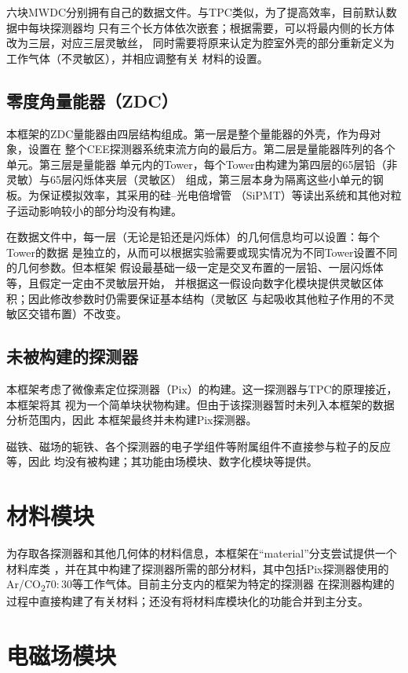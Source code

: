 \documentclass[bachelor,openany,oneside,color]{buaathesis}
\begin{document}
六块MWDC分别拥有自己的数据文件。与TPC类似，为了提高效率，目前默认数据中每块探测器均
只有三个长方体依次嵌套；根据需要，可以将最内侧的长方体改为三层，对应三层灵敏丝，
同时需要将原来认定为腔室外壳的部分重新定义为工作气体（不灵敏区），并相应调整有关
材料的设置。

\subsection{零度角量能器（ZDC）}

本框架的ZDC量能器由四层结构组成。第一层是整个量能器的外壳，作为母对象，设置在
整个CEE探测器系统束流方向的最后方。第二层是量能器阵列的各个单元。第三层是量能器
单元内的Tower，每个Tower由构建为第四层的65层铅（非灵敏）与65层闪烁体夹层（灵敏区）
组成，第三层本身为隔离这些小单元的钢板。为保证模拟效率，其采用的硅--光电倍增管
（SiPMT）等读出系统和其他对粒子运动影响较小的部分均没有构建。

在数据文件中，每一层（无论是铅还是闪烁体）的几何信息均可以设置：每个Tower的数据
是独立的，从而可以根据实验需要或现实情况为不同Tower设置不同的几何参数。但本框架
假设最基础一级一定是交叉布置的一层铅、一层闪烁体等，且假定一定由不灵敏层开始，
并根据这一假设向数字化模块提供灵敏区体积；因此修改参数时仍需要保证基本结构（灵敏区
与起吸收其他粒子作用的不灵敏区交错布置）不改变。

\subsection{未被构建的探测器}

本框架考虑了微像素定位探测器（Pix）的构建。这一探测器与TPC的原理接近，本框架将其
视为一个简单块状物构建。但由于该探测器暂时未列入本框架的数据分析范围内，因此
本框架最终并未构建Pix探测器。

磁铁、磁场的轭铁、各个探测器的电子学组件等附属组件不直接参与粒子的反应等，因此
均没有被构建；其功能由场模块、数字化模块等提供。

\section{材料模块}

为存取各探测器和其他几何体的材料信息，本框架在“material”分支尝试提供一个材料库类
，并在其中构建了探测器所需的部分材料，其中包括Pix探测器使用的
Ar/CO\textsubscript{2}$70:30$等工作气体。目前主分支内的框架为特定的探测器
在探测器构建的过程中直接构建了有关材料；还没有将材料库模块化的功能合并到主分支。

\section{电磁场模块}
\end{document}
